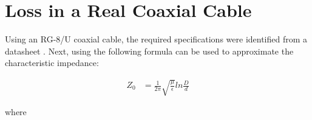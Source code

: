 \section{Loss in a Real Coaxial Cable}

Using an RG-8/U coaxial cable, the required specifications were 
identified from a datasheet \cite{coax}.
Next, using the following formula \cite{coaxformula} can be used to approximate the characteristic
impedance:

\begin{align}
Z_0&=\frac{1}{2\pi}\sqrt{\frac{\mu}{\epsilon}}ln\frac{D}{d}
\end{align}

where
